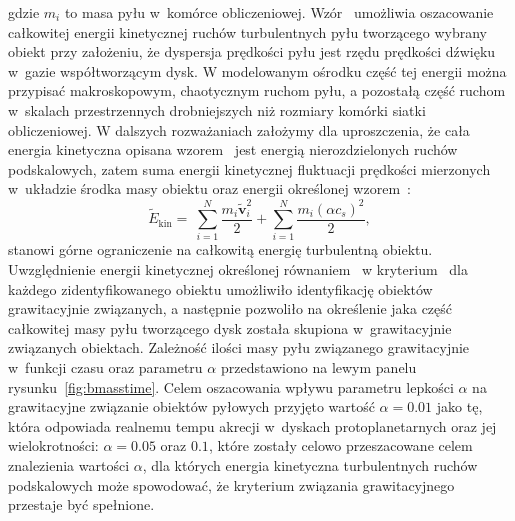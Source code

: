 gdzie $m_i$ to masa pyłu w~komórce obliczeniowej. 
Wzór~ umożliwia oszacowanie całkowitej energii kinetycznej ruchów
turbulentnych pyłu tworzącego wybrany obiekt przy założeniu, że dyspersja
prędkości pyłu jest rzędu prędkości dźwięku w~gazie współtworzącym dysk. W
modelowanym ośrodku część tej energii można przypisać makroskopowym, chaotycznym
ruchom pyłu, a pozostałą część ruchom w~skalach przestrzennych drobniejszych niż
rozmiary komórki siatki obliczeniowej. W dalszych rozważaniach założymy dla
uproszczenia, że cała energia kinetyczna opisana wzorem~ jest energią
nierozdzielonych ruchów podskalowych, zatem suma energii kinetycznej fluktuacji
prędkości mierzonych w~układzie środka masy obiektu oraz energii określonej
wzorem~:
%
\begin{equation}
   \label{eq:ekin}
   \tilde{E}_{\textrm{kin}} = \
   \sum\limits_{i=1}^N \frac{m_i\tilde{\mathbf{v}}_i^2}{2}
   + \sum\limits_{i=1}^N \frac{m_i \left(\alpha c_s\right)^2}{2},
\end{equation}
%
stanowi górne ograniczenie na całkowitą energię turbulentną obiektu.
Uwzględnienie energii kinetycznej określonej równaniem~\mref{eq:ekin} w
kryterium~\mref{eq:bcrit} dla każdego zidentyfikowanego obiektu umożliwiło
identyfikację obiektów grawitacyjnie związanych, a następnie pozwoliło na
określenie jaka część całkowitej masy pyłu tworzącego dysk
została skupiona w~grawitacyjnie związanych
obiektach. Zależność ilości masy pyłu związanego grawitacyjnie w~funkcji czasu
oraz parametru $\alpha$ przedstawiono na lewym panelu
rysunku~\ref{fig:bmasstime}. Celem oszacowania wpływu parametru lepkości
$\alpha$ na grawitacyjne związanie obiektów pyłowych przyjęto wartość
$\alpha=0.01$ jako tę, która odpowiada realnemu tempu akrecji w~dyskach
protoplanetarnych oraz jej wielokrotności: $\alpha=0.05$ oraz $0.1$, które
zostały celowo przeszacowane celem znalezienia wartości $\alpha$, dla których
energia kinetyczna turbulentnych ruchów podskalowych może spowodować, że
kryterium związania grawitacyjnego przestaje być spełnione.
%
